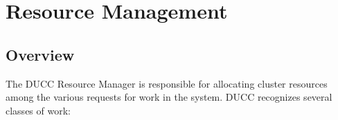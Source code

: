 % 
% 
% 
% 
\ifpdf
\else
{}
\fi
\chapter{Resource Management}
\label{chap:rm}
    \section{Overview}

    The DUCC Resource Manager is responsible for allocating cluster resources among the various 
    requests for work in the system. DUCC recognizes several classes of work: 

